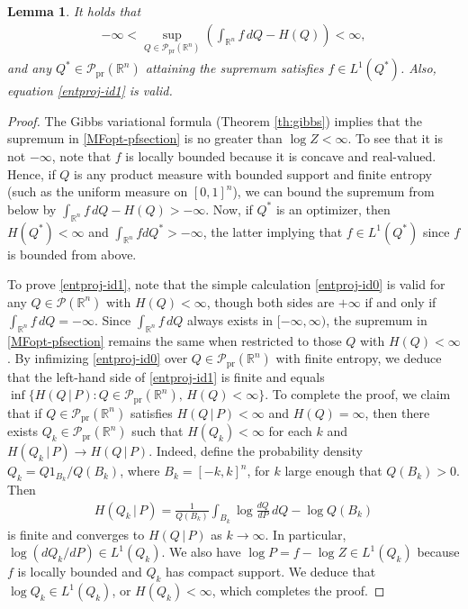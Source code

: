 \documentclass[11pt,reqno]{amsart}
\numberwithin{equation}{section}
\newtheorem{lemma}[theorem]{Lemma}
\theoremstyle{definition}
\def\R{{\mathbb R}}
\def\P{{\mathcal P}}
\def\Pprod{\P_{\mathrm{pr}}}
\begin{document}
\begin{lemma} \label{le:MFsup-finite}
	It holds that
	\begin{align}
		-\infty < \sup_{Q \in \Pprod(\R^n)} \left( \int_{\R^n} f\,dQ- H(Q)\right) < \infty,  \label{MFopt-pfsection}
	\end{align}
and any $Q^* \in \Pprod(\R^n)$ attaining the supremum satisfies $f \in L^1(Q^*)$. 
Also, equation \eqref{entproj-id1} is valid.
\end{lemma}
\begin{proof}
The Gibbs variational formula (Theorem \ref{th:gibbs}) implies that the supremum in \eqref{MFopt-pfsection} is no greater than $\log Z < \infty$. To see that it is not $-\infty$, note that $f$ is locally bounded because it is concave and real-valued. Hence, if $Q$ is any product measure with bounded support and finite entropy (such as the uniform measure on $[0,1]^n$), we can bound the supremum from below by $\int_{\R^n} f \, dQ- H(Q) > -\infty$. 
Now, if $Q^*$ is an optimizer, then $H(Q^*) < \infty$ and $\int_{\R^n} f dQ^* > -\infty$, the latter implying that $f \in L^1(Q^*)$ since $f$ is bounded from above.

To prove \eqref{entproj-id1}, note that the simple calculation \eqref{entproj-id0} is valid for any $Q \in \P(\R^n)$ with $H(Q) < \infty$, though both sides are $+\infty$ if and only if $\int_{\R^n} f\,dQ=-\infty$. Since $\int_{\R^n}f\,dQ$ always exists in $[-\infty,\infty)$, the supremum in \eqref{MFopt-pfsection} remains the same when restricted to those $Q$ with $H(Q) < \infty$. By infimizing \eqref{entproj-id0} over $Q \in \Pprod(\R^n)$ with finite entropy, we deduce that the left-hand side of \eqref{entproj-id1} is finite and equals $\inf\{H(Q\,|\,P) : Q \in \Pprod(\R^n), \, H(Q) < \infty\}$. To complete the proof, we claim that if $Q \in \Pprod(\R^n)$ satisfies $H(Q\,|\,P)<\infty$ and $H(Q)=\infty$, then there exists $Q_k \in \Pprod(\R^n)$ such that $H(Q_k) < \infty$ for each $k$ and $H(Q_k\,|\,P) \to H(Q\,|\,P)$. Indeed, define the probability density $Q_k=Q1_{B_k}/Q(B_k)$, where $B_k = [-k,k]^n$, for $k$ large enough that $Q(B_k) > 0$. Then 
\begin{align*}
H(Q_k\,|\,P) = \frac{1}{Q(B_k)}\int_{B_k} \log\frac{dQ}{dP}\,dQ - \log Q(B_k)
\end{align*}
is finite and converges to $H(Q\,|\,P)$ as $k\to\infty$. In particular, $\log (dQ_k/dP) \in L^1(Q_k)$. We also have  $\log P = f - \log Z \in L^1(Q_k)$ because $f$ is locally bounded and $Q_k$ has compact support. We deduce that $\log Q_k \in L^1(Q_k)$, or $H(Q_k) < \infty$, which completes the proof.

\end{proof}
\end{document}
